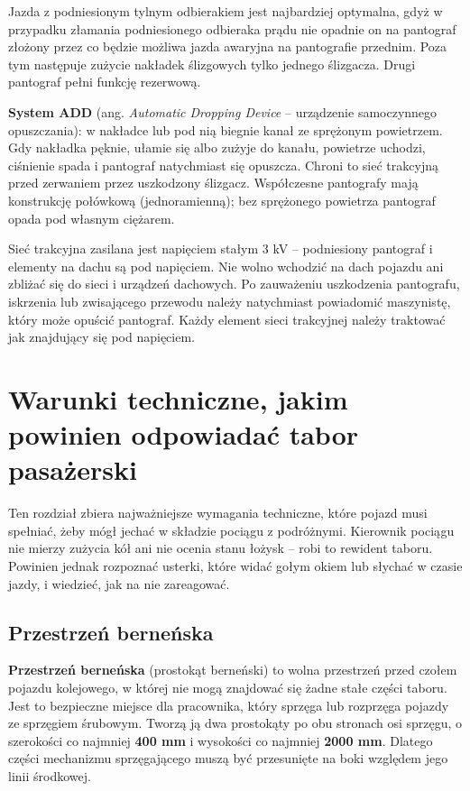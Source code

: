 Jazda z podniesionym tylnym odbierakiem jest najbardziej optymalna, gdyż w przypadku złamania podniesionego odbieraka prądu nie opadnie on na pantograf złożony przez co będzie możliwa jazda awaryjna na pantografie przednim. Poza tym następuje zużycie nakładek ślizgowych tylko jednego ślizgacza. Drugi pantograf pełni funkcję rezerwową. 


\textbf{System ADD} (ang. \textit{Automatic Dropping Device} – urządzenie samoczynnego opuszczania): w nakładce lub pod nią biegnie kanał ze sprężonym powietrzem. Gdy nakładka pęknie, ułamie się albo zużyje do kanału, powietrze uchodzi, ciśnienie spada i pantograf natychmiast się opuszcza. Chroni to sieć trakcyjną przed zerwaniem przez uszkodzony ślizgacz. Współczesne pantografy mają konstrukcję połówkową (jednoramienną); bez sprężonego powietrza pantograf opada pod własnym ciężarem.

\begin{tcolorbox}[colback=red!5!white,colframe=red!75!black,title=Uwaga – wysokie napięcie]
	Sieć trakcyjna zasilana jest napięciem stałym 3 kV – podniesiony pantograf i elementy na dachu są pod napięciem. Nie wolno wchodzić na dach pojazdu ani zbliżać się do sieci i urządzeń dachowych. Po zauważeniu uszkodzenia pantografu, iskrzenia lub zwisającego przewodu należy natychmiast powiadomić maszynistę, który może opuścić pantograf. Każdy element sieci trakcyjnej należy traktować jak znajdujący się pod napięciem.
\end{tcolorbox}

\chapter{Warunki techniczne, jakim powinien odpowiadać tabor pasażerski}
\label{ch:warunki-techniczne}

Ten rozdział zbiera najważniejsze wymagania techniczne, które pojazd musi spełniać, żeby mógł jechać w składzie pociągu z podróżnymi. Kierownik pociągu nie mierzy zużycia kół ani nie ocenia stanu łożysk – robi to rewident taboru. Powinien jednak rozpoznać usterki, które widać gołym okiem lub słychać w czasie jazdy, i wiedzieć, jak na nie zareagować.

\section{Przestrzeń berneńska}

\textbf{Przestrzeń berneńska} (prostokąt berneński) to wolna przestrzeń przed czołem pojazdu kolejowego, w której nie mogą znajdować się żadne stałe części taboru. Jest to bezpieczne miejsce dla pracownika, który sprzęga lub rozprzęga pojazdy ze sprzęgiem śrubowym. Tworzą ją dwa prostokąty po obu stronach osi sprzęgu, o szerokości co najmniej \textbf{400 mm} i wysokości co najmniej \textbf{2000 mm}. Dlatego części mechanizmu sprzęgającego muszą być przesunięte na boki względem jego linii środkowej.

